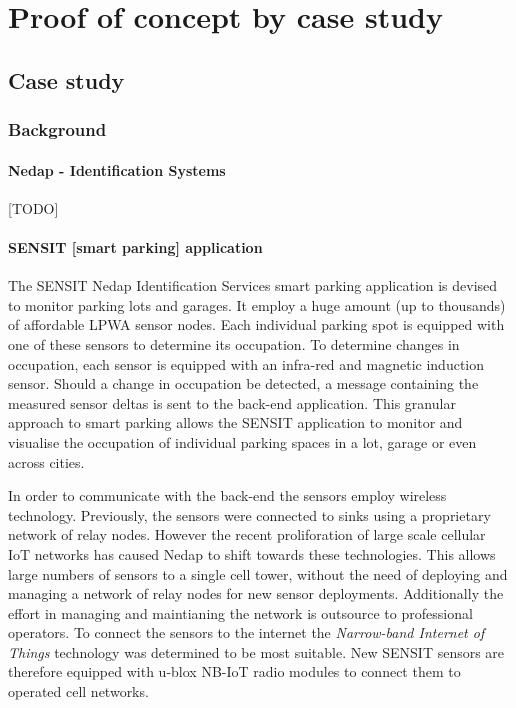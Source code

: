 \newcommand{\idsystems}{\nedap Identification Services }
\newcommand{\nedap}{Nedap }
\newcommand{\ublox}{u-blox }
\newcommand{\sensit}{SENSIT }
\chapter{Proof of concept by case study}
\label{ch:validation}
\section{Case study}
\subsection{Background}
\label{sec:sensit}
\subsubsection*{Nedap - Identification Systems}
[TODO]
\subsubsection*{\sensit [smart parking] application}
The \sensit \idsystems smart parking application is devised to monitor parking lots and garages. It employ a huge amount (up to thousands) of affordable LPWA sensor nodes. Each individual parking spot is equipped with one of these sensors to determine its occupation. To determine changes in occupation, each sensor is equipped with an infra-red and magnetic induction sensor. Should a change in occupation be detected, a message containing the measured sensor deltas is sent to the back-end application. This granular approach to smart parking allows the \sensit application to monitor and visualise the occupation of individual parking spaces in a lot, garage or even across cities.

In order to communicate with the back-end the sensors employ wireless technology. Previously, the sensors were connected to sinks using a proprietary network of relay nodes. However the recent proliforation of large scale cellular IoT networks has caused \nedap to shift towards these technologies. This allows large numbers of sensors to a single cell tower, without the need of deploying and managing a network of relay nodes for new sensor deployments. Additionally the effort in managing and maintianing the network is outsource to professional operators. To connect the sensors to the internet the \emph{Narrow-band Internet of Things} technology was determined to be most suitable. New \sensit sensors are therefore equipped with \ublox \cite{web:ublox} NB-IoT radio modules to connect them to operated cell networks.


